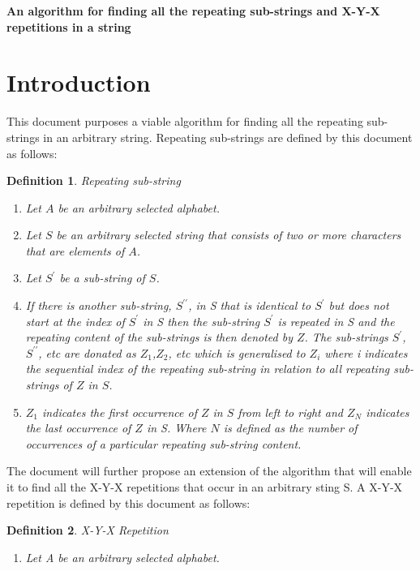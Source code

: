 \documentclass[12pt]{article}
\newtheorem{defn}{Definition}[section]
\begin{document}
\begin{center}
	\LARGE\textbf{An algorithm for finding all the repeating sub-strings and X-Y-X repetitions in a string}
\end{center}

\newpage
\tableofcontents
\newpage
\section{Introduction}
\begin{flushleft}
	This document purposes a viable algorithm for finding all the repeating sub-strings in an arbitrary string. Repeating sub-strings are defined by this document as follows:\\
	\begin{defn}
	    Repeating sub-string   
		\begin{enumerate}
			\item Let $A$ be an arbitrary selected alphabet.
			\item Let $S$ be an arbitrary selected string that consists of two or more characters that are elements of $A$.
			\item Let  $S^{\prime}$ be a sub-string of $S$.
			\item If there is another sub-string,  $S^{\prime\prime}$, in S that is identical to  $S^{\prime}$ but does not start at the index of  $S^{\prime}$ in S then the sub-string  $S^{\prime}$ is repeated in S and the repeating content of the sub-strings is then denoted by $Z$. The sub-strings $S^{\prime}$, $S^{\prime\prime}$, etc are donated as $Z_{1}$,$Z_{2}$, etc which is generalised to $Z_{i}$ where i indicates the sequential index of the repeating sub-string in relation to all repeating sub-strings of $Z$ in $S$.
			\item $Z_{1}$ indicates the first occurrence of $Z$ in $S$ from left to right and $Z_{N}$ indicates the last occurrence of $Z$ in S. Where $N$ is defined as the number of occurrences of a particular repeating sub-string content.  
		\end{enumerate}
	\end{defn}
	The document will further propose an extension of the algorithm that will enable it to find all the X-Y-X repetitions that occur in an arbitrary sting S. A X-Y-X repetition is defined by this document as follows:   
	\begin{defn} X-Y-X Repetition
		\begin{enumerate}
			\item Let A be an arbitrary selected alphabet.

\end{enumerate}
\end{defn}
\end{flushleft}
\end{document}
